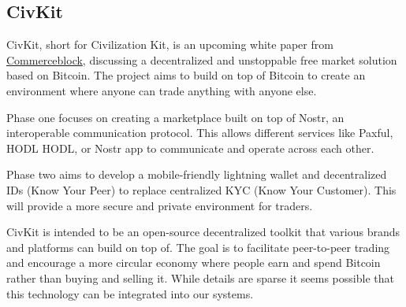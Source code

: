 \subsection{CivKit}
CivKit, short for Civilization Kit, is an upcoming white paper from \href{https://www.commerceblock.com/}{Commerceblock}, discussing a decentralized and unstoppable free market solution based on Bitcoin. The project aims to build on top of Bitcoin to create an environment where anyone can trade anything with anyone else. \par
Phase one focuses on creating a marketplace built on top of Nostr, an interoperable communication protocol. This allows different services like Paxful, HODL HODL, or Nostr app to communicate and operate across each other.\par
Phase two aims to develop a mobile-friendly lightning wallet and decentralized IDs (Know Your Peer) to replace centralized KYC (Know Your Customer). This will provide a more secure and private environment for traders.\par 
CivKit is intended to be an open-source decentralized toolkit that various brands and platforms can build on top of. The goal is to facilitate peer-to-peer trading and encourage a more circular economy where people earn and spend Bitcoin rather than buying and selling it. While details are sparse it seems possible that this technology can be integrated into our systems. 

%

